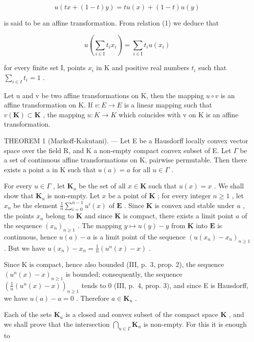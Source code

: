 \[
u (t x + (1 - t) y) = t u (x) + (1 - t) u (y)\tag{1}
\]

is said to be an affine transformation. From relation (1) we deduce that

\[
u \left(\sum_ {i \in \mathrm{I}} t _ {i} x _ {i}\right) = \sum_ {i \in \mathrm{I}} t _ {i} u \left(x _ {i}\right)\tag{2}
\]

for every finite set I, points \(x_{i}\) in K and positive real numbers \(t_i\) such that \(\sum_{i\in I}t_i = 1\) .

Let u and v be two affine transformations on K, then the mapping \(u \circ v\) is an affine transformation on K. If \(v: E \to E\) is a linear mapping such that \(v(\mathbf{K}) \subset \mathbf{K}\) , the mapping \(u: K \to K\) which coincides with v on K is an affine transformation.

THEOREM 1 (Markoff-Kakutani). --- Let E be a Hausdorff locally convex vector space over the field R, and K a non-empty compact convex subset of E. Let \(\Gamma\) be a set of continuous affine transformations on K, pairwise permutable. Then there exists a point a in K such that \(u(a) = a\) for all \(u \in \Gamma\) .

For every \(u \in \Gamma\) , let \(\mathbf{K}_u\) be the set of all \(x \in \mathbf{K}\) such that \(u(x) = x\) . We shall show that \(\mathbf{K}_u\) is non-empty. Let \(x\) be a point of \(\mathbf{K}\) ; for every integer \(n \geqslant 1\) , let \(x_n\) be the element \(\frac{1}{n} \sum_{i=0}^{n-1} u^i(x)\) of \(\mathbf{E}\) . Since \(\mathbf{K}\) is convex and stable under \(u\) , the points \(x_n\) belong to \(\mathbf{K}\) and since \(\mathbf{K}\) is compact, there exists a limit point \(a\) of the sequence \((x_n)_{n \geqslant 1}\) . The mapping \(y \mapsto u(y) - y\) from \(\mathbf{K}\) into \(\mathbf{E}\) is continuous, hence \(u(a) - a\) is a limit point of the sequence \((u(x_n) - x_n)_{n \geqslant 1}\) . But we have \(u(x_n) - x_n = \frac{1}{n} (u^n(x) - x)\) .

Since K is compact, hence also bounded (III, p.~3, prop. 2), the sequence \((u^n(x) - x)_{n\geqslant 1}\) is bounded; consequently, the sequence \(\left(\frac{1}{n} (u^n (x) - x)\right)_{n\geqslant 1}\) tends to 0 (III, p.~4, prop. 3), and since E is Hausdorff, we have \(u(a) - a = 0\) . Therefore \(a\in \mathbf{K}_u\) .

Each of the sets \(\mathbf{K}_u\) is a closed and convex subset of the compact space \(\mathbf{K}\) , and we shall prove that the intersection \(\bigcap_{u\in \Gamma}\mathbf{K}_u\) is non-empty. For this it is enough to

